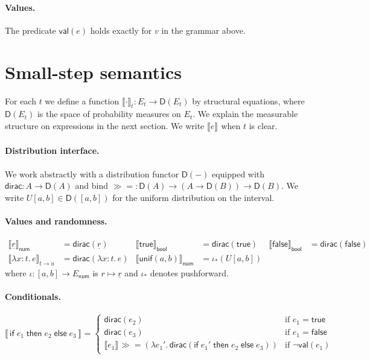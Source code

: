 \documentclass[11pt]{article}
\newcommand{\D}{\mathsf{D}}
\newcommand{\dirac}{\mathsf{dirac}}
\newcommand{\bind}{\mathbin{\gg\!=}}
\newcommand{\sem}[2][]{\llbracket #2 \rrbracket_{#1}}
\newcommand{\E}[1]{E_{#1}}
\newcommand{\ty}[1]{\mathsf{#1}}
\newcommand{\bool}{\ty{bool}}
\newcommand{\num}{\ty{num}}
\newcommand{\arr}{\rightarrow}
\newcommand{\val}{\mathsf{val}}
\newcommand{\ul}[1]{\underline{#1}} %
\begin{document}
\paragraph{Values.} The predicate $\val(e)$ holds exactly for $v$ in the grammar above.

\section*{Small-step semantics}



For each $t$ we define a function $\sem[t]{\cdot}:\E{t}\to \D(\E{t})$ by structural equations,
where $\D(\E{t})$ is the space of probability measures on $\E{t}$.
We explain the measurable structure on expressions in the next section.
We write $\sem{e}$ when $t$ is clear.

\paragraph{Distribution interface.}
We work abstractly with a distribution functor $\D(-)$ equipped with
$\dirac:A\to \D(A)$ and bind $\bind:\D(A)\to (A\to \D(B))\to \D(B)$.
We write $U[a,b]\in \D([a,b])$ for the uniform distribution on the interval.

\paragraph{Values and randomness.}
\begin{align*}
\sem[\num]{\ul r} &= \dirac(\ul r)
&
\sem[\bool]{\ty{true}} &= \dirac(\ty{true})
&
\sem[\bool]{\ty{false}} &= \dirac(\ty{false})
\\
\sem[{t\arr u}]{\lambda x{:}t.\,e} &= \dirac(\lambda x{:}t.\,e)
&
\sem[\num]{\ty{unif}(a,b)} &= \iota_{*}(U[a,b])
\end{align*}
where $\iota:[a,b]\to \E{\num}$ is $r\mapsto \ul r$ and $\iota_{*}$ denotes pushforward.

\paragraph{Conditionals.}
\[
\sem{\,\ty{if}\;e_1\;\ty{then}\;e_2\;\ty{else}\;e_3\,}
=
\begin{cases}
\dirac(e_2) & \text{if } e_1=\ty{true}\\
\dirac(e_3) & \text{if } e_1=\ty{false}\\
\sem{e_1}\bind (\lambda e_1'.\, \dirac(\ty{if}\;e_1'\;\ty{then}\;e_2\;\ty{else}\;e_3)) & \text{if } \neg\val(e_1)
\end{cases}
\]
\end{document}

